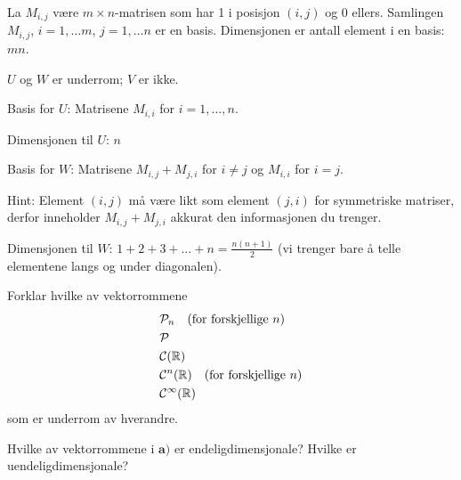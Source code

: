 \begin{losning}
\begin{punkt}
La $M_{i,j}$ være $m\times n$-matrisen som har 1 i posisjon $(i,j)$ og 0 ellers. Samlingen $M_{i,j}$, $i=1,\dots m$, $j=1,\dots n$ er en basis. Dimensjonen er antall element i en basis: $mn$.
\end{punkt}

\begin{punkt}
$U$ og $W$ er underrom; $V$ er ikke.
\end{punkt}

\begin{punkt}
\noindent
Basis for $U$: Matrisene $M_{i,i}$ for $i=1,\dots,n$.

\noindent
Dimensjonen til $U$: $n$

\noindent
Basis for $W$: Matrisene $M_{i,j}+M_{j,i}$ for $i\neq j$ og $M_{i,i}$ for $i=j$.

\noindent
Hint: Element $(i,j)$ må være likt som element $(j,i)$ for symmetriske matriser, derfor inneholder $M_{i,j}+M_{j,i}$ akkurat den informasjonen du trenger.


\noindent 
Dimensjonen til $W$: $1+2+3+\dots +n=\frac{n(n+1)}{2}$ (vi trenger bare å telle elementene langs og under diagonalen).
\end{punkt}


\end{losning}



\begin{oppgave}

\begin{punkt}
Forklar hvilke av vektorrommene
\begin{align*}
& \mathcal{P}_n \quad \text{(for forskjellige~$n$)} \\
& \mathcal{P} \\
& \mathcal{C}(\mathbb{R}) \\
& \mathcal{C}^n(\mathbb{R}) \quad \text{(for forskjellige~$n$)} \\
& \mathcal{C}^\infty(\mathbb{R})
\end{align*}
som er underrom av hverandre.
\end{punkt}

\begin{punkt}
Hvilke av vektorrommene i $\textbf{a)}$ er endeligdimensjonale?
Hvilke er uendeligdimensjonale?
\end{punkt}


\end{oppgave}

